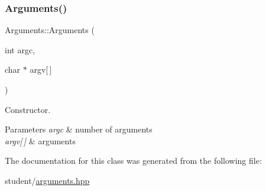 \subsubsection{\texorpdfstring{Arguments()}{Arguments()}}
{\footnotesize\ttfamily Arguments\+::\+Arguments (\begin{DoxyParamCaption}\item[{int}]{argc,  }\item[{char $\ast$}]{argv\mbox{[}$\,$\mbox{]} }\end{DoxyParamCaption})\hspace{0.3cm}{\ttfamily [inline]}}



Constructor. 


\begin{DoxyParams}{Parameters}
{\em argc} & number of arguments \\
\hline
{\em argv\mbox{[}$\,$\mbox{]}} & arguments \\
\hline
\end{DoxyParams}


The documentation for this class was generated from the following file\+:\begin{DoxyCompactItemize}
\item 
student/\hyperlink{arguments_8hpp}{arguments.\+hpp}\end{DoxyCompactItemize}
